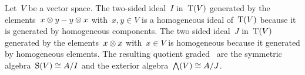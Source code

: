 \begin{examples}
  Let~$V$ be a vector space.
  The two-sided ideal~$I$ in~$\operatorname{T}(V)$ generated by the elements~$x \otimes y - y \otimes x$ with~$x,y \in V$ is a homogeneous ideal of~$\operatorname{T}(V)$ because it is generated by homogeneous components.
  The two sided ideal~$J$ in~$\operatorname{T}(V)$ generated by the elements~$x \otimes x$ with~$x \in V$ is homogeneous because it generated by homogeneous elements.
  The resulting quotient graded~{\algebras{$\kf$}} are the symmetric algebra~$\operatorname{S}(V) \cong A/I$ and the exterior algebra~$\bigwedge(V) \cong A/J$.
\end{examples}


% 
